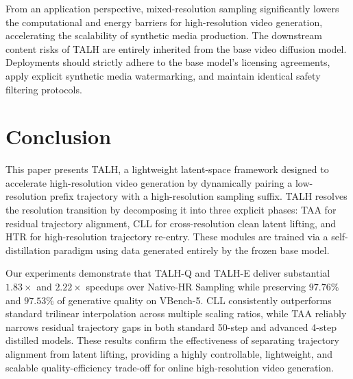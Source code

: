 From an application perspective, mixed-resolution sampling significantly
lowers the computational and energy barriers for high-resolution video
generation, accelerating the scalability of synthetic media production.
The downstream content risks of TALH are entirely inherited from the
base video diffusion model. Deployments should strictly adhere to the
base model's licensing agreements, apply explicit synthetic media
watermarking, and maintain identical safety filtering protocols.

\section{Conclusion}

This paper presents TALH, a lightweight latent-space framework designed
to accelerate high-resolution video generation by dynamically pairing a
low-resolution prefix trajectory with a high-resolution sampling suffix.
TALH resolves the resolution transition by decomposing it into three
explicit phases: TAA for residual trajectory alignment, CLL for
cross-resolution clean latent lifting, and HTR for high-resolution
trajectory re-entry. These modules are trained via a self-distillation
paradigm using data generated entirely by the frozen base model.

Our experiments demonstrate that TALH-Q and TALH-E deliver substantial
\(1.83\times\) and \(2.22\times\) speedups over Native-HR Sampling while
preserving \(97.76\%\) and \(97.53\%\) of generative quality on
VBench-5. CLL consistently outperforms standard trilinear interpolation
across multiple scaling ratios, while TAA reliably narrows residual
trajectory gaps in both standard 50-step and advanced 4-step distilled
models. These results confirm the effectiveness of separating trajectory
alignment from latent lifting, providing a highly controllable,
lightweight, and scalable quality-efficiency trade-off for online
high-resolution video generation.
